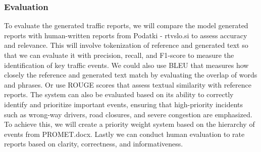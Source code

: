 \documentclass[fleqn,moreauthors,10pt]{ds_report}
\begin{document}
\subsubsection*{Evaluation}
To evaluate the generated traffic reports, we will compare the model generated reports with human-written reports from Podatki - rtvslo.si to assess accuracy and relevance. This will involve tokenization of reference and generated text so that we can evaluate it with precision, recall, and F1-score to measure the identification of key traffic events. We could also use BLEU that measures how closely the reference and generated text match by evaluating the overlap of words and phrases. Or use ROUGE scores that assess textual similarity with reference reports. The system can also be evaluated based on its ability to correctly identify and prioritize important events, ensuring that high-priority incidents such as wrong-way drivers, road closures, and severe congestion are emphasized. To achieve this, we will create a priority weight system based on the hierarchy of events from PROMET.docx. Lastly we can conduct human evaluation to rate reports based on clarity, correctness, and informativeness. 








\end{document}

